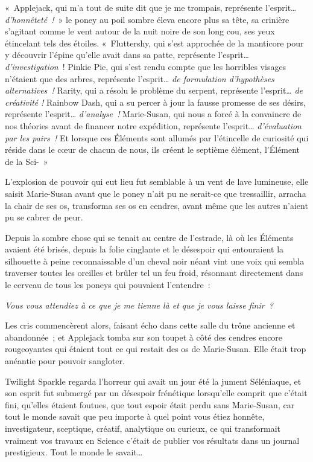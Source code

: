 «~Applejack, qui m'a tout de suite dit que je me trompais, représente l'esprit… \emph{d'honnêteté~!}~» le poney au poil sombre éleva encore plus sa tête, sa crinière s'agitant comme le vent autour de la nuit noire de son long cou, ses yeux étincelant tels des étoiles. «~Fluttershy, qui s'est approchée de la manticore pour y découvrir l'épine qu'elle avait dans sa patte, représente l'esprit… \emph{d'investigation}~! Pinkie Pie, qui s'est rendu compte que les horribles visages n'étaient que des arbres, représente l'esprit… \emph{de formulation d'hypothèses alternatives~!} Rarity, qui a résolu le problème du serpent, représente l'esprit… \emph{de créativité} \emph{!} Rainbow Dash, qui a su percer à jour la fausse promesse de ses désirs, représente l'esprit… \emph{d'analyse~!} Marie-Susan, qui nous a forcé à la convaincre de nos théories avant de financer notre expédition, représente l'esprit… \emph{d'évaluation par les pairs~!} Et lorsque ces Éléments sont allumés par l'étincelle de curiosité qui réside dans le cœur de chacun de nous, ils créent le septième élément, l'Élément de la Sci-~»

L'explosion de pouvoir qui eut lieu fut semblable à un vent de lave lumineuse, elle saisit Marie-Susan avant que le poney n'ait pu ne serait-ce que tressaillir, arracha la chair de ses os, transforma ses os en cendres, avant même que les autres n'aient pu se cabrer de peur.

Depuis la sombre chose qui se tenait au centre de l'estrade, là où les Éléments avaient été brisés, depuis la folie cinglante et le désespoir qui entouraient la silhouette à peine reconnaissable d'un cheval noir néant vint une voix qui sembla traverser toutes les oreilles et brûler tel un feu froid, résonnant directement dans le cerveau de tous les poneys qui pouvaient l'entendre~:

\emph{Vous vous attendiez à ce que je me tienne là et que je vous laisse finir~?}

Les cris commencèrent alors, faisant écho dans cette salle du trône ancienne et abandonnée~; et Applejack tomba sur son toupet à côté des cendres encore rougeoyantes qui étaient tout ce qui restait des os de Marie-Susan. Elle était trop anéantie pour pouvoir sangloter.

Twilight Sparkle regarda l'horreur qui avait un jour été la jument Séléniaque, et son esprit fut submergé par un désespoir frénétique lorsqu'elle comprit que c'était fini, qu'elles étaient foutues, que tout espoir était perdu sans Marie-Susan, car tout le monde savait que peu importe à quel point vous étiez honnête, investigateur, sceptique, créatif, analytique ou curieux, ce qui transformait vraiment vos travaux en Science c'était de publier vos résultats dans un journal prestigieux. Tout le monde le savait…

